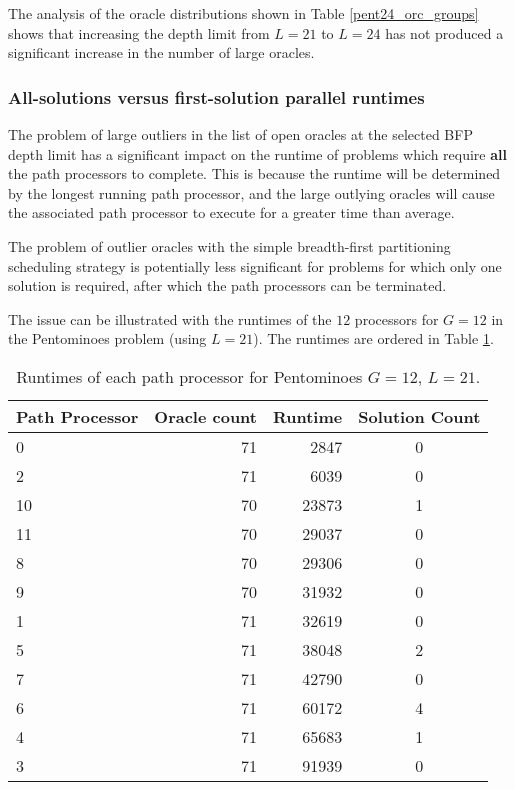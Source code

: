 The analysis of the oracle distributions shown in Table \ref{pent24_orc_groups} shows
that increasing the depth limit from $L=21$ to $L=24$ has not produced a significant
increase in the number of large oracles.

\subsubsection{All-solutions versus first-solution parallel runtimes}

The problem of large outliers in the list of open oracles at the selected BFP depth
limit has a significant impact on the runtime of problems which require \textbf{all} the
path processors to complete.  This is because the runtime will be determined by the
longest running path processor, and the large outlying oracles will cause the associated
path processor to execute for a greater time than average.

The problem of outlier oracles with the simple breadth-first partitioning scheduling
strategy is potentially less significant for problems for which
only one solution is required, after which the path processors can be terminated.

The issue can be illustrated with the runtimes of the $12$ processors for $G=12$ in 
the Pentominoes problem (using $L=21$).  The runtimes are ordered in Table
\ref{pent_12_runtimes}.

\begin{table}[htbp]
{\small
\begin{tabular}{| l | r | r | c |}
\hline
\textbf{Path Processor} & \textbf{Oracle count} & \textbf{Runtime} & \textbf{Solution Count} \\
\hline
0  & 71 & 2847  & 0 \\
2  & 71 & 6039  & 0 \\
10 & 70 & 23873 & 1 \\
11 & 70 & 29037 & 0 \\
8  & 70 & 29306 & 0 \\
9  & 70 & 31932 & 0 \\
1  & 71 & 32619 & 0 \\
5  & 71 & 38048 & 2 \\
7  & 71 & 42790 & 0 \\
6  & 71 & 60172 & 4 \\
4  & 71 & 65683 & 1 \\
3  & 71 & 91939 & 0 \\
\hline
\end{tabular}
}
\caption{Runtimes of each path processor for Pentominoes $G=12$, $L=21$.}
\label{pent_12_runtimes}
\end{table}

